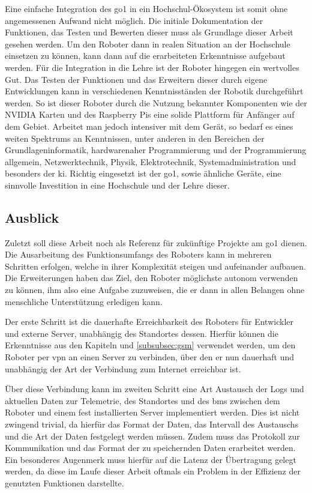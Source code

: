 Eine einfache Integration des \gls{go1} in ein Hochschul-Ökosystem ist somit ohne angemessenen Aufwand nicht möglich.
Die initiale Dokumentation der Funktionen, das Testen und Bewerten dieser muss als Grundlage dieser Arbeit gesehen werden.
Um den Roboter dann in realen Situation an der Hochschule einsetzen zu können, kann dann auf die erarbeiteten Erkenntnisse
aufgebaut werden.
Für die Integration in die Lehre ist der Roboter hingegen ein wertvolles Gut.
Das Testen der Funktionen und das Erweitern dieser durch eigene Entwicklungen kann in verschiedenen Kenntnisständen der
Robotik durchgeführt werden.
So ist dieser Roboter durch die Nutzung bekannter Komponenten wie der NVIDIA Karten und des Raspberry Pis eine solide Plattform
für Anfänger auf dem Gebiet.
Arbeitet man jedoch intensiver mit dem Gerät, so bedarf es eines weiten Spektrums an Kenntnissen, unter anderen in den Bereichen
der Grundlageninformatik, hardwarenaher Programmierung und der Programmierung allgemein, Netzwerktechnik, Physik, Elektrotechnik,
Systemadministration und besonders der \gls{ki}.
Richtig eingesetzt ist der \gls{go1}, sowie ähnliche Geräte, eine sinnvolle Investition in eine Hochschule und der Lehre dieser.


\subsection{Ausblick}
\label{subsec:ausblick}

Zuletzt soll diese Arbeit noch als Referenz für zukünftige Projekte am \gls{go1} dienen.
Die Ausarbeitung des Funktionsumfangs des Roboters kann in mehreren Schritten erfolgen, welche in ihrer Komplexität
steigen und aufeinander aufbauen.
Die Erweiterungen haben das Ziel, den Roboter möglichste autonom verwenden zu können, ihm also eine Aufgabe zuzuweisen,
die er dann in allen Belangen ohne menschliche Unterstützung erledigen kann.

Der erste Schritt ist die dauerhafte Erreichbarkeit des Roboters für Entwickler und externe Server, unabhängig des Standortes
dessen.
Hierfür können die Erkenntnisse aus den Kapiteln  und \ref{subsubsec:gsm} verwendet werden, um
den Roboter per \gls{vpn} an einen Server zu verbinden, über den er nun dauerhaft und unabhängig der Art der Verbindung zum Internet
erreichbar ist.

Über diese Verbindung kann im zweiten Schritt eine Art Austausch der Logs und aktuellen Daten zur Telemetrie, des Standortes und
des \gls{bms} zwischen dem Roboter und einem fest installierten Server implementiert werden.
Dies ist nicht zwingend trivial, da hierfür das Format der Daten, das Intervall des Austauschs und die Art der Daten festgelegt werden
müssen.
Zudem muss das Protokoll zur Kommunikation und das Format der zu speichernden Daten erarbeitet werden.
Ein besonderes Augenmerk muss hierfür auf die Latenz der Übertragung gelegt werden, da diese im Laufe dieser Arbeit
oftmals ein Problem in der Effizienz der genutzten Funktionen darstellte.

